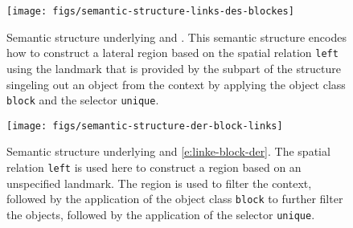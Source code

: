 \begin{figure}
\begin{center}
\texttt{[image: figs/semantic-structure-links-des-blockes]}
\end{center}
\caption[Semantic structure example lateral region with landmark]{%
Semantic structure underlying 
and . This semantic structure encodes how to construct
a lateral region based on the spatial relation {\footnotesize\tt left} using the landmark 
that is provided by the subpart of the structure singeling out an object from the context
by applying the object class {\footnotesize\tt block} and the selector {\footnotesize\tt unique}.}
\label{f:semantic-structure-2}
\end{figure}
\begin{figure}
\begin{center}
\texttt{[image: figs/semantic-structure-der-block-links]}
\end{center}
\caption[Semantic structure example lateral region without landmark]{Semantic structure underlying 
 and \ref{e:linke-block-der}. 
The spatial relation {\footnotesize\tt left} is used here to construct a
region based on an unspecified landmark. The region is used to filter the context,
followed by the application of the object class {\footnotesize\tt block} to further filter the objects,
followed by the application of the selector {\footnotesize\tt unique}.}
\label{f:semantic-structure-3}
\label{f:semantic-structure}
\end{figure}


